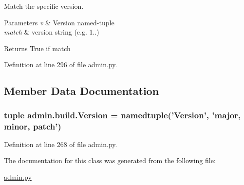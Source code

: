 Match the specific version. 


\begin{DoxyParams}{Parameters}
{\em v} & Version named-\/tuple \\
\hline
{\em match} & version string (e.\-g. 1..) \\
\hline
\end{DoxyParams}
\begin{DoxyReturn}{Returns}
True if match 
\end{DoxyReturn}


Definition at line 296 of file admin.\-py.



\subsection{Member Data Documentation}
\hypertarget{classadmin_1_1build_acf6af7ed40a09ac4e0029edd50a82ae0}{
\subsubsection[{Version}]{\setlength{\rightskip}{0pt plus 5cm}tuple admin.\-build.\-Version = namedtuple('Version', 'major, minor, patch')\hspace{0.3cm}{\ttfamily [static]}}}\label{classadmin_1_1build_acf6af7ed40a09ac4e0029edd50a82ae0}


Definition at line 268 of file admin.\-py.



The documentation for this class was generated from the following file\-:\begin{DoxyCompactItemize}
\item 
\hyperlink{admin_8py}{admin.\-py}\end{DoxyCompactItemize}
